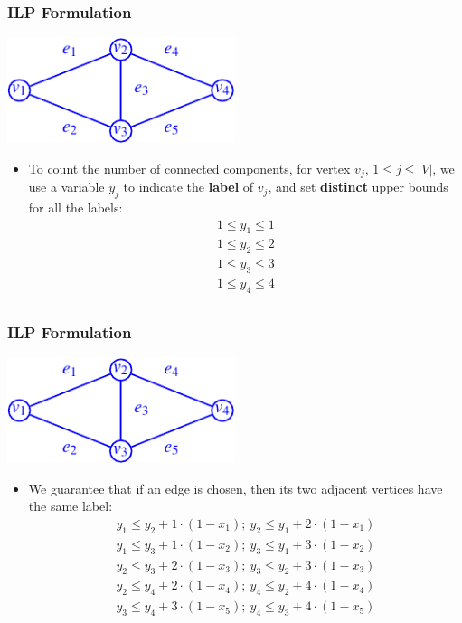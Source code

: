 \frame
{
	\frametitle{ILP Formulation}

	\begin{center}
	\includegraphics[width=0.5\textwidth]{Lec8-Genome-Rearrangement-Problem-figs/example.pdf}
	\end{center}


	\begin{itemize}
	\item<1-> To count the number of connected components, for vertex $v_j$, $1\le j \le |V|$,
		we use a variable $y_j$ to indicate the {\bf label} of $v_j$, and set {\bf distinct} upper 
		bounds for all the labels:
		\begin{eqnarray*}
			1\le  y_1  \le 1\\ 
			1\le  y_2  \le 2\\ 
			1\le  y_3  \le 3\\ 
			1\le  y_4  \le 4\\ 
		\end{eqnarray*}
	\end{itemize}

}

\frame
{
	\frametitle{ILP Formulation}

	\begin{center}
	\includegraphics[width=0.5\textwidth]{Lec8-Genome-Rearrangement-Problem-figs/example.pdf}
	\end{center}

	\begin{itemize}
	\item<1-> We guarantee that if an edge is chosen, then its two adjacent vertices have the same label: 
		\begin{align*}
			y_1 \le y_2 + 1 \cdot (1 - x_1);\  y_2 \le y_1 + 2 \cdot (1 - x_1) \tag{for $e_1$}\\
			y_1 \le y_3 + 1 \cdot (1 - x_2);\  y_3 \le y_1 + 3 \cdot (1 - x_2) \tag{for $e_2$}\\
			y_2 \le y_3 + 2 \cdot (1 - x_3);\  y_3 \le y_2 + 3 \cdot (1 - x_3) \tag{for $e_3$}\\
			y_2 \le y_4 + 2 \cdot (1 - x_4);\  y_4 \le y_2 + 4 \cdot (1 - x_4) \tag{for $e_4$}\\
			y_3 \le y_4 + 3 \cdot (1 - x_5);\  y_4 \le y_3 + 4 \cdot (1 - x_5) \tag{for $e_5$}\\
		\end{align*}
	\end{itemize}
}

